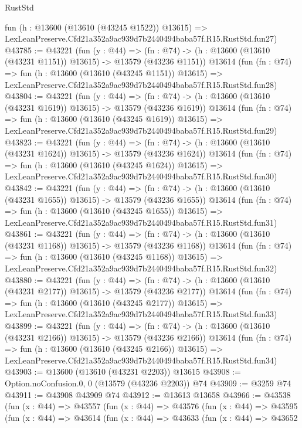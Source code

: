 \begin{lexlean}{RustStd}
\begin{coremodule}
    fun (h : @13600 (@13610 (@43245 @1522)) @13615) =>
    LexLeanPreserve.Cfd21a352a9ac939d7b2440494baba57f.R15.RustStd.fun27)
@43785 := @43221
    (fun (y : @44) =>
    (fn : @74) -> (h : @13600 (@13610 (@43231 @1151)) @13615) -> @13579 (@43236 @1151))
    @13614
    (fun (fn : @74) =>
    fun (h : @13600 (@13610 (@43245 @1151)) @13615) =>
    LexLeanPreserve.Cfd21a352a9ac939d7b2440494baba57f.R15.RustStd.fun28)
@43804 := @43221
    (fun (y : @44) =>
    (fn : @74) -> (h : @13600 (@13610 (@43231 @1619)) @13615) -> @13579 (@43236 @1619))
    @13614
    (fun (fn : @74) =>
    fun (h : @13600 (@13610 (@43245 @1619)) @13615) =>
    LexLeanPreserve.Cfd21a352a9ac939d7b2440494baba57f.R15.RustStd.fun29)
@43823 := @43221
    (fun (y : @44) =>
    (fn : @74) -> (h : @13600 (@13610 (@43231 @1624)) @13615) -> @13579 (@43236 @1624))
    @13614
    (fun (fn : @74) =>
    fun (h : @13600 (@13610 (@43245 @1624)) @13615) =>
    LexLeanPreserve.Cfd21a352a9ac939d7b2440494baba57f.R15.RustStd.fun30)
@43842 := @43221
    (fun (y : @44) =>
    (fn : @74) -> (h : @13600 (@13610 (@43231 @1655)) @13615) -> @13579 (@43236 @1655))
    @13614
    (fun (fn : @74) =>
    fun (h : @13600 (@13610 (@43245 @1655)) @13615) =>
    LexLeanPreserve.Cfd21a352a9ac939d7b2440494baba57f.R15.RustStd.fun31)
@43861 := @43221
    (fun (y : @44) =>
    (fn : @74) -> (h : @13600 (@13610 (@43231 @1168)) @13615) -> @13579 (@43236 @1168))
    @13614
    (fun (fn : @74) =>
    fun (h : @13600 (@13610 (@43245 @1168)) @13615) =>
    LexLeanPreserve.Cfd21a352a9ac939d7b2440494baba57f.R15.RustStd.fun32)
@43880 := @43221
    (fun (y : @44) =>
    (fn : @74) -> (h : @13600 (@13610 (@43231 @2177)) @13615) -> @13579 (@43236 @2177))
    @13614
    (fun (fn : @74) =>
    fun (h : @13600 (@13610 (@43245 @2177)) @13615) =>
    LexLeanPreserve.Cfd21a352a9ac939d7b2440494baba57f.R15.RustStd.fun33)
@43899 := @43221
    (fun (y : @44) =>
    (fn : @74) -> (h : @13600 (@13610 (@43231 @2166)) @13615) -> @13579 (@43236 @2166))
    @13614
    (fun (fn : @74) =>
    fun (h : @13600 (@13610 (@43245 @2166)) @13615) =>
    LexLeanPreserve.Cfd21a352a9ac939d7b2440494baba57f.R15.RustStd.fun34)
@43903 := @13600 (@13610 (@43231 @2203)) @13615
@43908 := Option.noConfusion.{0, 0} (@13579 (@43236 @2203)) @74
@43909 := @3259 @74
@43911 := @43908 @43909 @74
@43912 := @13613 @13658
@43966 := @43538
    (fun (x : @44) =>
    @43557
      (fun (x : @44) =>
      @43576
        (fun (x : @44) =>
        @43595
          (fun (x : @44) =>
          @43614
            (fun (x : @44) =>
            @43633
              (fun (x : @44) =>
              @43652

\end{coremodule}
\end{lexlean}
